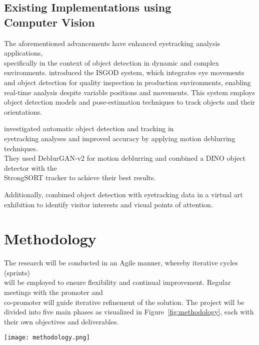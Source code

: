 \documentclass[english]{hogent-article}
\begin{document}
\subsection{Existing Implementations using\\ Computer Vision}

The aforementioned advancements have enhanced eyetracking analysis applications,\\ specifically in the context of object detection in dynamic and complex environments.
\textcite{Cho2024} introduced the ISGOD system, which integrates eye movements and object detection for quality inspection in production 
environments, enabling real-time analysis despite variable positions and movements. 
This system employs object detection models and pose-estimation techniques to track objects and their orientations.

\textcite{Cederin2023} investigated automatic object detection and tracking in\\ eyetracking analyses and improved accuracy by applying motion deblurring techniques.\\ 
They used DeblurGAN-v2 for motion deblurring and combined a DINO object detector with the\\ StrongSORT tracker to achieve their best results.

Additionally, \textcite{Kulyk2023} combined object detection with eyetracking data in a virtual art exhibition to identify visitor interests and visual points of attention.

\section{Methodology}
\label{sec:methodology}

The research will be conducted in an Agile manner, whereby iterative cycles (sprints)\\ will be employed 
to ensure flexibility and continual improvement.
Regular meetings with the promoter and\\ co-promoter will guide iterative refinement of the solution.
The project will be divided into five main phases as visualized in Figure~\ref{fig:methodology}, each with their own objectives and deliverables.

\begin{figure*}
  \centering
  \texttt{[image: methodology.png]}
  \caption{Overview of the project phases, their deliverables, and the relationships between them.}
  \label{fig:methodology}
\end{figure*}
\end{document}
